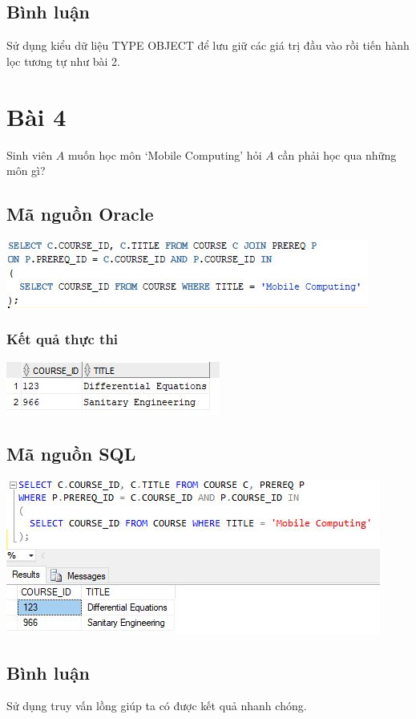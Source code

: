 \documentclass[12pt,a4paper]{report}
\begin{document}
\subsection{Bình luận}
Sử dụng kiểu dữ liệu TYPE OBJECT để lưu giữ các giá trị đầu vào rồi tiến hành lọc tương tự như bài 2.
\section{Bài 4}
\begin{boxedminipage}[t]{15.5cm}
	Sinh viên $A$ muốn học môn ‘Mobile Computing’ hỏi $A$ cần phải học qua những môn gì?	
\end{boxedminipage}

\subsection{Mã nguồn Oracle}
\includegraphics[scale=1]{b4o}
\subsubsection{Kết quả thực thi}
\includegraphics[scale=1]{kb4o}
\subsection{Mã nguồn SQL}
\includegraphics[scale=1]{b4s}
\subsection{Bình luận}
Sử dụng truy vấn lồng giúp ta có được kết quả nhanh chóng.
\end{document}
